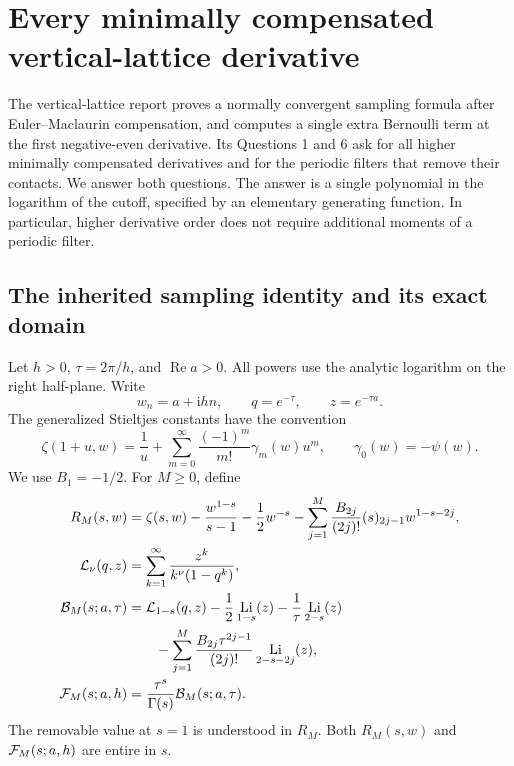 \documentclass[11pt,letterpaper]{article}
\numberwithin{equation}{section}
\theoremstyle{definition}
\theoremstyle{remark}
\DeclareMathOperator{\Li}{Li}
\DeclareMathOperator{\Ree}{Re}
\newcommand{\ii}{\mathrm i}
\begin{document}
\section{Every minimally compensated vertical-lattice derivative}
\label{sec:lattice}

The vertical-lattice report \cite{RepoVertical} proves a normally
convergent sampling formula after Euler--Maclaurin compensation, and
computes a single extra Bernoulli term at the first negative-even
derivative. Its Questions 1 and 6 ask for all higher minimally
compensated derivatives and for the periodic filters that remove their
contacts. We answer both questions. The answer is a single polynomial
in the logarithm of the cutoff, specified by an elementary generating
function. In particular, higher derivative order does not require
additional moments of a periodic filter.

\subsection{The inherited sampling identity and its exact domain}

Let \(h>0\), \(\tau=2\pi/h\), and \(\Ree a>0\). All powers use the
analytic logarithm on the right half-plane. Write
\[
 w_n=a+\ii hn,\qquad q=e^{-\tau},\qquad z=e^{-\tau a}.
\]
The generalized Stieltjes constants have the convention
\begin{equation}\label{eq:lattice-stieltjes}
 \zeta(1+u,w)=\frac1u+
       \sum_{m=0}^{\infty}\frac{(-1)^m}{m!}\gamma_m(w)u^m,
 \qquad \gamma_0(w)=-\psi(w).
\end{equation}
We use \(B_1=-1/2\). For \(M\geq0\), define
\begin{align}
 R_M(s,w)&=\zeta(s,w)-\frac{w^{1-s}}{s-1}-\frac12w^{-s}
 -\sum_{j=1}^{M}\frac{B_{2j}}{(2j)!}(s)_{2j-1}w^{1-s-2j},
 \label{eq:root-remainder}\\
 {\cal L}_{\nu}(q,z)&=\sum_{k=1}^{\infty}
             \frac{z^k}{k^\nu(1-q^k)},\label{eq:root-lambert}\\
 {\cal B}_M(s;a,\tau)&={\cal L}_{1-s}(q,z)
       -\frac12\Li_{1-s}(z)-\frac1\tau\Li_{2-s}(z)\notag\\
 &\hspace{7mm}
       -\sum_{j=1}^{M}\frac{B_{2j}\tau^{2j-1}}{(2j)!}
                    \Li_{2-s-2j}(z),\label{eq:root-bracket}\\
 {\cal F}_M(s;a,h)&=\frac{\tau^s}{\Gamma(s)}{\cal B}_M(s;a,\tau).
 \label{eq:root-spectral}
\end{align}
The removable value at \(s=1\) is understood in \(R_M\).
Both \(R_M(s,w)\) and \({\cal F}_M(s;a,h)\) are entire in \(s\).
\end{document}
